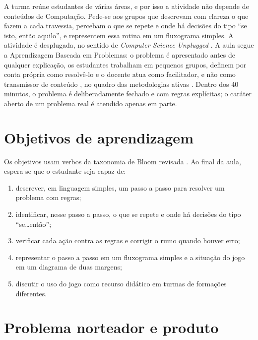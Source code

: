 \documentclass[12pt,a4paper]{article}
\begin{document}
A turma reúne estudantes de várias áreas, e por isso a atividade não depende de
conteúdos de Computação. Pede-se aos grupos que descrevam com clareza o que
fazem a cada travessia, percebam o que se repete e onde há decisões do tipo
``se isto, então aquilo'', e representem essa rotina em um fluxograma simples.
A atividade é desplugada, no sentido de \textit{Computer Science Unplugged}
\cite{bell2009}. A aula segue a Aprendizagem Baseada em Problemas: o
problema é apresentado antes de qualquer explicação, os estudantes trabalham em
pequenos grupos, definem por conta própria como resolvê-lo e o docente atua
como facilitador, e não como transmissor de conteúdo \cite{barrows1986,hmelo2004},
no quadro das metodologias ativas \cite{bacich2018}. Dentro dos 40 minutos, o
problema é deliberadamente fechado e com regras explícitas; o caráter aberto
de um problema real é atendido apenas em parte.

\section{Objetivos de aprendizagem}

Os objetivos usam verbos da taxonomia de Bloom revisada \cite{anderson2001}.
Ao final da aula, espera-se que o estudante seja capaz de:

\begin{enumerate}[label=\arabic*.]
  \item descrever, em linguagem simples, um passo a passo para resolver um
        problema com regras;
  \item identificar, nesse passo a passo, o que se repete e onde há decisões
        do tipo ``se\ldots então'';
  \item verificar cada ação contra as regras e corrigir o rumo quando houver erro;
  \item representar o passo a passo em um fluxograma simples e a situação do
        jogo em um diagrama de duas margens;
  \item discutir o uso do jogo como recurso didático em turmas de formações
        diferentes.
\end{enumerate}

\section{Problema norteador e produto}
\end{document}
